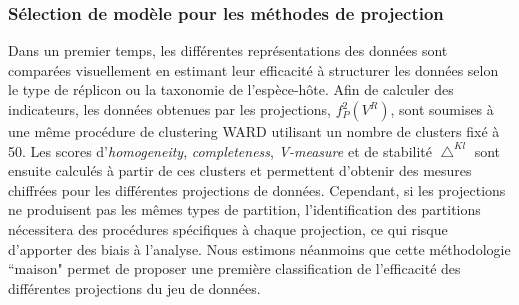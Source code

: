 \subsubsection{Sélection de modèle pour les méthodes de projection}
	Dans un premier temps, les différentes représentations des données sont comparées visuellement en estimant leur efficacité à structurer les données selon le type de réplicon ou la taxonomie de l'espèce-hôte. Afin de calculer des indicateurs, les données obtenues par les projections, $f_{P}^{2}(V^{R})$, sont soumises à une même procédure de clustering WARD utilisant un nombre de clusters fixé à 50. Les scores d'\textit{homogeneity}, \textit{completeness}, \textit{V-measure} et de stabilité $\bigtriangleup^{Kl}$ sont ensuite calculés à partir de ces clusters et permettent d'obtenir des mesures chiffrées pour les différentes projections de données. Cependant, si les projections ne produisent pas les mêmes types de partition, l'identification des partitions nécessitera des procédures spécifiques à chaque projection, ce qui risque d'apporter des biais à l'analyse. Nous estimons néanmoins que cette méthodologie ``maison" permet de proposer une première classification de l'efficacité des différentes projections du jeu de données.

     
